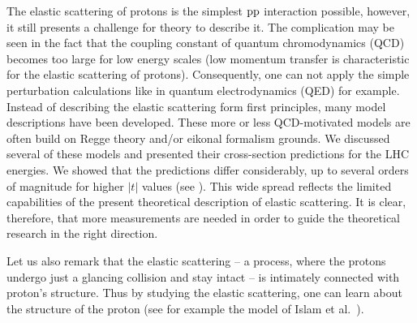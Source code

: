 The elastic scattering of protons is the simplest $\rm pp$ interaction possible, however, it still presents a challenge for theory to describe it. The complication may be seen in the fact that the coupling constant of quantum chromodynamics (QCD) becomes too large for low energy scales (low momentum transfer is characteristic for the elastic scattering of protons). Consequently, one can not apply the simple perturbation calculations like in quantum electrodynamics (QED) for example. Instead of describing the elastic scattering form first principles, many model descriptions have been developed. These more or less QCD-motivated models are often build on Regge theory and/or eikonal formalism grounds. We discussed several of these models and presented their cross-section predictions for the LHC energies. We showed that the predictions differ considerably, up to several orders of magnitude for higher $|t|$ values (see ). This wide spread reflects the limited capabilities of the present theoretical description of elastic scattering. It is clear, therefore, that more measurements are needed in order to guide the theoretical research in the right direction.

Let us also remark that the elastic scattering -- a process, where the protons undergo just a glancing collision and stay intact -- is intimately connected with proton's structure. Thus by studying the elastic scattering, one can learn about the structure of the proton (see for example the model of Islam et al.~).


